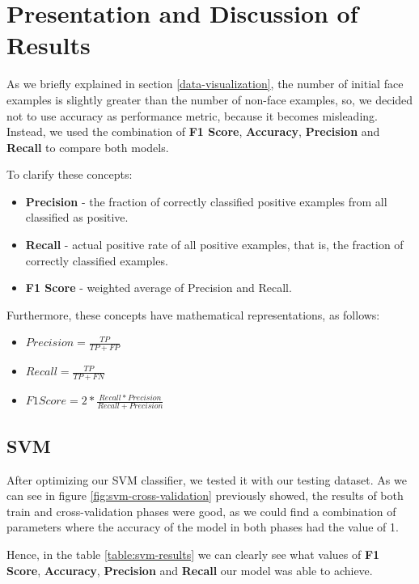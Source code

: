 \section{Presentation and Discussion of Results}

As we briefly explained in section \ref{data-visualization}, the number of initial face examples is slightly greater than the number of non-face examples, so, we decided not to use accuracy as performance metric, because it becomes misleading. Instead, we used the combination of \textbf{F1 Score}, \textbf{Accuracy}, \textbf{Precision} and \textbf{Recall} to compare both models.

To clarify these concepts:

\begin{itemize} 
\item \textbf{Precision} - the fraction of correctly classified positive examples from all classified as positive.
\item \textbf{Recall} - actual positive rate of all positive examples, that is, the fraction of correctly classified examples.
\item \textbf{F1 Score} - weighted average of Precision and Recall.
\end{itemize}

Furthermore, these concepts have mathematical representations, as follows:

\begin{itemize} 
\item  \(Precision = \frac{TP}{TP+FP}\)  \\
\item  \(Recall = \frac{TP}{TP+FN}\) \\
\item  \(F1 Score = 2*\frac{Recall * Precision}{Recall + Precision}\) \\
\end{itemize}

\subsection{SVM}

After optimizing our SVM classifier, we tested it with our testing dataset. As we can see in figure \ref{fig:svm-cross-validation} previously showed, the results of both train and cross-validation phases were good, as we could find a combination of parameters where the accuracy of the model in both phases had the value of 1.

Hence, in the table \ref{table:svm-results} we can clearly see what values of \textbf{F1 Score}, \textbf{Accuracy}, \textbf{Precision} and \textbf{Recall} our model was able to achieve.

